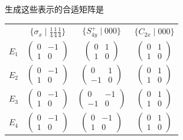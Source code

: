 生成这些表示的合适矩阵是
\begin{center}
\begin{tabular}{lccc}
 & $\{\sigma_{x} \mid {\frac{1}{4}}{\frac{1}{4}}{\frac{1}{4}}\}$ & $\{S^{+}_{4y} \mid 000\}$ & $\{C_{2x} \mid 000\}$\\[0.5ex]
$E_{1}$ & $\begin{pmatrix} 0 & -1\\ 1 & 0 \end{pmatrix}$ & $\begin{pmatrix} 0 & 1\\ 1 & 0 \end{pmatrix}$ & $\begin{pmatrix} 0 & 1\\ 1 & 0 \end{pmatrix}$\\[2ex]
$E_{2}$ & $\begin{pmatrix} 0 & -1\\ 1 & 0 \end{pmatrix}$ & $\begin{pmatrix} 0 & 1\\ -1 & 0 \end{pmatrix}$ & $\begin{pmatrix} 0 & 1\\ 1 & 0 \end{pmatrix}$\\[2ex]
$E_{3}$ & $\begin{pmatrix} 0 & -1\\ 1 & 0 \end{pmatrix}$ & $\begin{pmatrix} 0 & -1\\ -1 & 0 \end{pmatrix}$ & $\begin{pmatrix} 0 & 1\\ 1 & 0 \end{pmatrix}$\\[2ex]
$E_{4}$ & $\begin{pmatrix} 0 & -1\\ 1 & 0 \end{pmatrix}$ & $\begin{pmatrix} 0 & -1\\ 1 & 0 \end{pmatrix}$ & $\begin{pmatrix} 0 & 1\\ 1 & 0 \end{pmatrix}$
\end{tabular}
\end{center}

